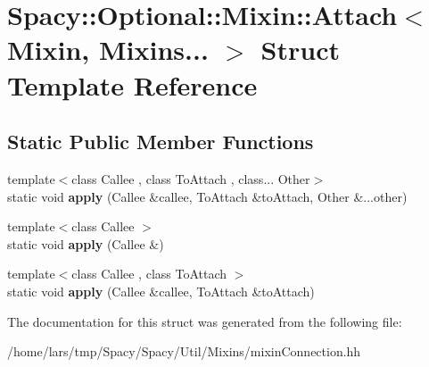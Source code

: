 \hypertarget{structSpacy_1_1Optional_1_1Mixin_1_1Attach_3_01Mixin_00_01Mixins_8_8_8_01_4}{}\section{Spacy\+:\+:Optional\+:\+:Mixin\+:\+:Attach$<$ Mixin, Mixins... $>$ Struct Template Reference}
\label{structSpacy_1_1Optional_1_1Mixin_1_1Attach_3_01Mixin_00_01Mixins_8_8_8_01_4}
\subsection*{Static Public Member Functions}
\begin{DoxyCompactItemize}
\item 
{\footnotesize template$<$class Callee , class To\+Attach , class... Other$>$ }\\static void {\bfseries apply} (Callee \&callee, To\+Attach \&to\+Attach, Other \&...other)\hypertarget{structSpacy_1_1Optional_1_1Mixin_1_1Attach_3_01Mixin_00_01Mixins_8_8_8_01_4_ac25dafb054bf7b9b07c488be985668b5}{}\label{structSpacy_1_1Optional_1_1Mixin_1_1Attach_3_01Mixin_00_01Mixins_8_8_8_01_4_ac25dafb054bf7b9b07c488be985668b5}

\item 
{\footnotesize template$<$class Callee $>$ }\\static void {\bfseries apply} (Callee \&)\hypertarget{structSpacy_1_1Optional_1_1Mixin_1_1Attach_3_01Mixin_00_01Mixins_8_8_8_01_4_aec048652480a6d75b7c9aca38839c9bb}{}\label{structSpacy_1_1Optional_1_1Mixin_1_1Attach_3_01Mixin_00_01Mixins_8_8_8_01_4_aec048652480a6d75b7c9aca38839c9bb}

\item 
{\footnotesize template$<$class Callee , class To\+Attach $>$ }\\static void {\bfseries apply} (Callee \&callee, To\+Attach \&to\+Attach)\hypertarget{structSpacy_1_1Optional_1_1Mixin_1_1Attach_3_01Mixin_00_01Mixins_8_8_8_01_4_a9490b0e8d8b64abc40ec9343ac651231}{}\label{structSpacy_1_1Optional_1_1Mixin_1_1Attach_3_01Mixin_00_01Mixins_8_8_8_01_4_a9490b0e8d8b64abc40ec9343ac651231}

\end{DoxyCompactItemize}


The documentation for this struct was generated from the following file\+:\begin{DoxyCompactItemize}
\item 
/home/lars/tmp/\+Spacy/\+Spacy/\+Util/\+Mixins/mixin\+Connection.\+hh\end{DoxyCompactItemize}
